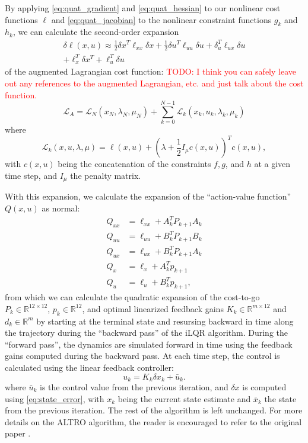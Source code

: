 \documentclass[letterpaper, 10 pt, conference]{ieeeconf}  %
\newcommand{\half}{\frac{1}{2}}
\newcommand{\R}{\mathbb{R}}
\newcommand{\todo}[1]{\textcolor{red}{TODO: #1}}
\begin{document}
    By applying \eqref{eq:quat_gradient} and \eqref{eq:quat_hessian} to our nonlinear cost
    functions $\ell$ and 
    \eqref{eq:quat_jacobian} to the nonlinear constraint functions $g_k$ and $h_k$, we can calculate
    the second-order expansion 
    \begin{multline}
        \delta \ell(x,u) \approx  \half \delta x^T \ell_{xx} \delta x
            + \half \delta u^T \ell_{uu} \delta u + \delta_u^T \ell_{ux} \delta u \\
            + \ell_x^T \delta x^T + \ell_u^T \delta u 
    \end{multline}
    of the augmented Lagrangian cost function: \todo{I think you can safely leave out any references to the augmented Lagrangian, etc. and just talk about the cost function.}
    \begin{equation}
        \mathcal{L}_A = \mathcal{L}_N(x_N,\lambda_N,\mu_N) + 
            \sum_{k=0}^{N-1} \mathcal{L}_k(x_k,u_k,\lambda_k,\mu_k)
    \end{equation}
    where
    \begin{equation}
        \mathcal{L}_k(x,u,\lambda,\mu) = \ell(x,u) + 
            (\lambda + \half I_\mu c(x,u))^T c(x,u),
    \end{equation}
    with $c(x,u)$ being the concatenation of the constraints $f,g$, and $h$ at a given time step,
    and $I_\mu$ the penalty matrix.

    With this expansion, we calculate the expansion of the ``action-value function'' $Q(x,u)$
    as normal:
    \begin{align}
        Q_{xx} &= \ell_{xx} + A_{k}^T P_{k+1} A_{k} \label{Qxx_exp}\\
        Q_{uu} &= \ell_{uu} + B_{k}^T P_{k+1} B_{k} \label{Quu_exp}\\
        Q_{ux} &= \ell_{ux} + B_{k}^T P_{k+1} A_{k} \label{Qux_exp}\\
        Q_x &= \ell_x  + A_{k}^T p_{k+1} \label{Qx_exp}\\
        Q_u &= \ell_u + B_{k}^T p_{k+1} \label{Qu_exp},
    \end{align}
    from which we can calculate the quadratic expansion of the cost-to-go 
    $P_k \in \R^{12 \times 12}$, $p_k \in \R^{12}$, and optimal linearized feedback gains 
    $K_k \in \R^{m \times 12}$ and $d_k \in \R^m$ by starting at the terminal state and
    resursing backward in time along the trajectory during the ``backward pass'' of the iLQR
    algorithm. During the ``forward pass'', the dynamics are simulated forward in time using
    the feedback gains computed during the backward pass. At each time step, the control is 
    calculated using the linear feedback controller: 
    \begin{equation} \label{eq:mlqr_control}
        u_k = K_k \delta x_k + \bar{u}_k.
    \end{equation}
    where $\bar{u}_k$ is the control value from the previous iteration, and $\delta x$ is
    computed using \eqref{eq:state_error}, with $x_k$ being the current state estimate
    and $\bar{x}_k$ the state from the previous iteration. The rest of the algorithm is
    left unchanged. For more details on the ALTRO algorithm, the reader is encouraged to
    refer to the original paper \cite{howell2019altro}.
\end{document}
